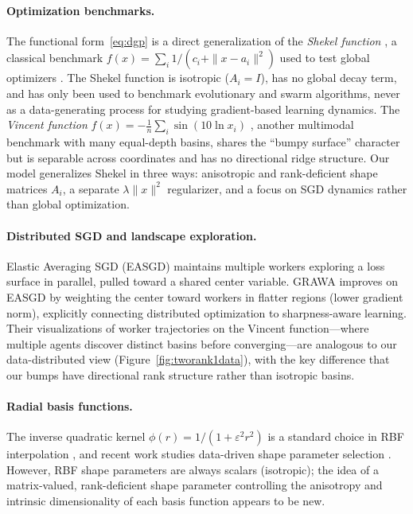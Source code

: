 \documentclass{article}
\begin{document}
\paragraph{Optimization benchmarks.}
The functional form~\eqref{eq:dgp} is a direct generalization of the
\emph{Shekel function} \cite{shekel1971test}, a classical benchmark
$f(x) = \sum_i 1/(c_i + \|x - a_i\|^2)$ used to test global
optimizers \cite{jamil2013literature,naser2025review}. The Shekel
function is isotropic ($A_i = I$), has no global decay term, and has
only been used to benchmark evolutionary and swarm algorithms, never as
a data-generating process for studying gradient-based learning dynamics.
The \emph{Vincent function} $f(x) = -\tfrac{1}{n}\sum_i \sin(10\ln x_i)$
\cite{li2013cec}, another multimodal benchmark with many equal-depth
basins, shares the ``bumpy surface'' character but is separable across
coordinates and has no directional ridge structure.
Our model generalizes Shekel in three ways: anisotropic and rank-deficient
shape matrices $A_i$, a separate $\lambda\|x\|^2$ regularizer, and a focus on SGD
dynamics rather than global optimization.

\paragraph{Distributed SGD and landscape exploration.}
Elastic Averaging SGD (EASGD) \cite{zhang2015easgd} maintains multiple
workers exploring a loss surface in parallel, pulled toward a shared center
variable. GRAWA \cite{dimlioglu2024grawa} improves on EASGD by weighting
the center toward workers in flatter regions (lower gradient norm),
explicitly connecting distributed optimization to sharpness-aware learning.
Their visualizations of worker trajectories on the Vincent function---where
multiple agents discover distinct basins before converging---are analogous
to our data-distributed view (Figure~\ref{fig:tworank1data}), with the
key difference that our bumps have directional rank structure rather than
isotropic basins.

\paragraph{Radial basis functions.}
The inverse quadratic kernel $\phi(r) = 1/(1 + \varepsilon^2 r^2)$ is a
standard choice in RBF interpolation
\cite{hardy1971multiquadric,buhmann2003radial}, and recent work studies
data-driven shape parameter selection \cite{hanveiga2024robust}. However,
RBF shape parameters are always scalars (isotropic); the idea of a
matrix-valued, rank-deficient shape parameter controlling the anisotropy
and intrinsic dimensionality of each basis function appears to be new.
\end{document}

